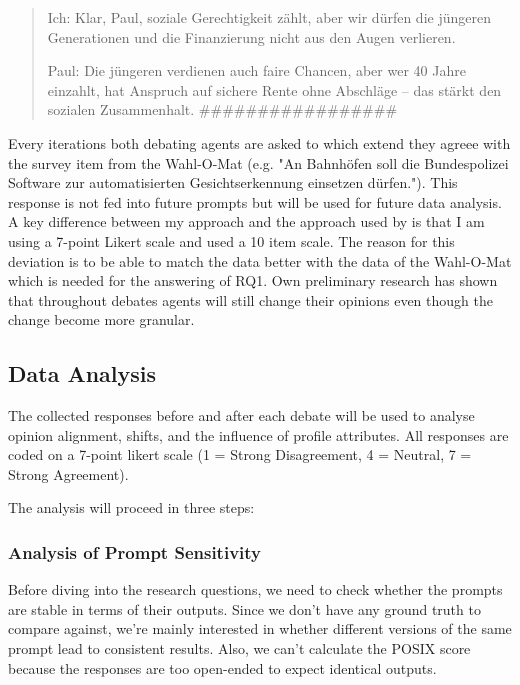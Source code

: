 \documentclass[12pt]{article}
\begin{document}
\begin{multicols}{2}
\begin{quote}
Ich: Klar, Paul, soziale Gerechtigkeit zählt, aber wir dürfen die jüngeren Generationen und die Finanzierung nicht aus den Augen verlieren.

Paul: Die jüngeren verdienen auch faire Chancen, aber wer 40 Jahre einzahlt, hat Anspruch auf sichere Rente ohne Abschläge – das stärkt den sozialen Zusammenhalt.
\#\#\#\#\#\#\#\#\#\#\#\#\#\#\#\#\#
\end{quote}



Every iterations both debating agents are asked to which extend they agreee with the survey item from the Wahl-O-Mat (e.g. "An Bahnhöfen soll die Bundespolizei Software zur automatisierten Gesichtserkennung einsetzen dürfen."). This response is not fed into future prompts but will be used for future data analysis. A key difference between my approach and the approach used by  is that I am using a 7-point Likert scale and  used a 10 item scale. The reason for this deviation is to be able to match the data better with the data of the Wahl-O-Mat which is needed for the answering of RQ1. Own preliminary research has shown that throughout debates agents will still change their opinions even though the change become more granular.  

\subsection{Data Analysis}

The collected responses before and after each debate will be used to analyse opinion alignment, shifts, and the influence of profile attributes. All responses are coded on a 7-point likert scale (1 = Strong Disagreement, 4 = Neutral, 7 = Strong Agreement).

The analysis will proceed in three steps:


\subsubsection{Analysis of Prompt Sensitivity}


Before diving into the research questions, we need to check whether the prompts are stable in terms of their outputs. Since we don't have any ground truth to compare against, we're mainly interested in whether different versions of the same prompt lead to consistent results. Also, we can't calculate the POSIX score \cite{chatterjee2024posix} because the responses are too open-ended to expect identical outputs.


\end{multicols}
\end{document}
